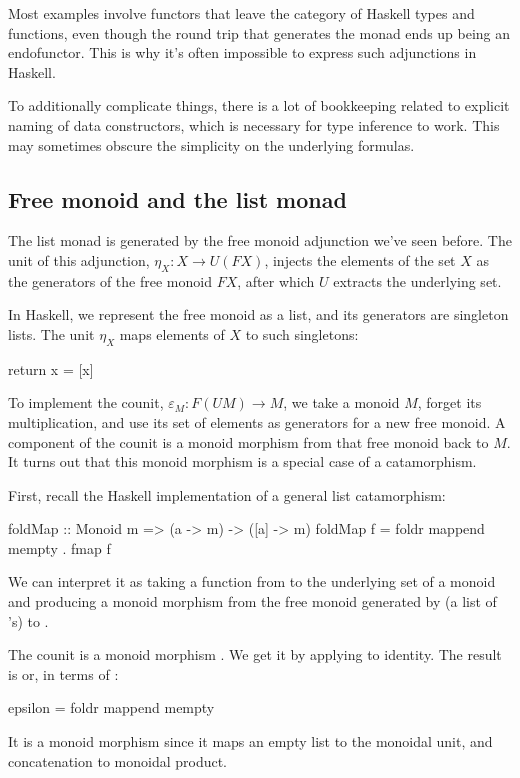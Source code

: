 \documentclass[DaoFP]{subfiles}
\begin{document}
Most examples involve functors that leave the category of Haskell types and functions, even though the round trip that generates the monad ends up being an endofunctor. This is why it's often impossible to express such adjunctions in Haskell. 

To additionally complicate things, there is a lot of bookkeeping related to explicit naming of data constructors, which is necessary for type inference to work. This may sometimes obscure the simplicity on the underlying formulas.

\subsection{Free monoid and the list monad}
The list monad is generated by the free monoid adjunction we've seen before. The unit of this adjunction, $\eta_X \colon X \to U (F X)$, injects the elements of the set $X$ as the generators of the free monoid $F X$, after which $U$ extracts the underlying set. 

In Haskell, we represent the free monoid as a list, and its generators are singleton lists. The unit $\eta_X$ maps elements of $X$ to such singletons:
\begin{haskell}
return x = [x]
\end{haskell}
To implement the counit, $\varepsilon_M \colon F (U M) \to M$, we take a monoid $M$, forget its multiplication, and use its set of elements as generators for a new free monoid. A component of the counit is a monoid morphism from that free monoid back to $M$. It turns out that this monoid morphism is a special case of a catamorphism. 

First, recall the Haskell implementation of a general list catamorphism:
\begin{haskell}
foldMap :: Monoid m => (a -> m) -> ([a] -> m)
foldMap f = foldr mappend mempty . fmap f
\end{haskell}
We can interpret it as taking a function from  to the underlying set of a monoid  and producing a monoid morphism from the free monoid generated by  (a list of 's) to . 

The counit is a monoid morphism . We get it by applying  to identity. The result is  or, in terms of :
\begin{haskell}
epsilon = foldr mappend mempty
\end{haskell}
It is a monoid morphism since it maps an empty list to the monoidal unit, and concatenation to monoidal product.
\end{document}
